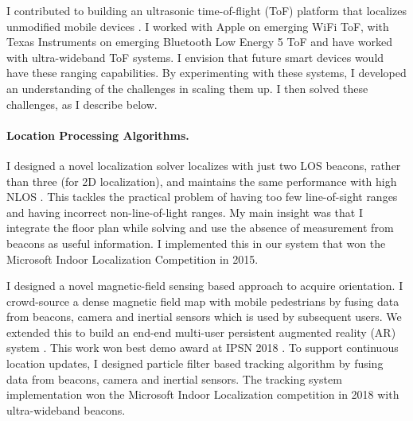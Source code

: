 \documentclass[10pt]{article}
\begin{document}
I contributed to building an ultrasonic time-of-flight (ToF) platform that localizes unmodified mobile devices \cite{rtas-alps-platform, lazik2015alps,lazik2015alpsdemo}. %
I worked with Apple on emerging WiFi ToF, with Texas Instruments on emerging Bluetooth Low Energy 5 ToF and have worked with ultra-wideband ToF systems. I envision that future smart devices would have these ranging capabilities. %
By experimenting with these systems, I developed an understanding of the challenges in scaling them up. I then solved these challenges, as I describe below. %

\paragraph{Location Processing Algorithms.  } 
I designed a novel localization solver localizes with just two LOS beacons, rather than three (for 2D localization), and maintains the same performance with high NLOS \cite{rajagopal2018enhancing}.  This tackles the practical problem of having too few line-of-sight ranges and having incorrect non-line-of-light ranges. My main insight was that I integrate the floor plan while solving and use the absence of measurement from beacons as useful information. 
I implemented this in our system that won the Microsoft Indoor Localization Competition in 2015.

I designed a novel magnetic-field sensing based approach to acquire orientation. I crowd-source a dense magnetic field map with mobile pedestrians by fusing data from beacons, camera and inertial sensors which is used by subsequent users. 
We extended this to build an end-end multi-user persistent augmented reality (AR) system \cite{mobileAR}. 
This work won best demo award at IPSN 2018 \cite{rajagopal2018welcome}. 
To support continuous location updates, I designed particle filter based tracking algorithm by fusing data from beacons, camera and inertial sensors. The tracking system implementation won the Microsoft Indoor Localization competition in 2018 with ultra-wideband beacons.
\end{document}
